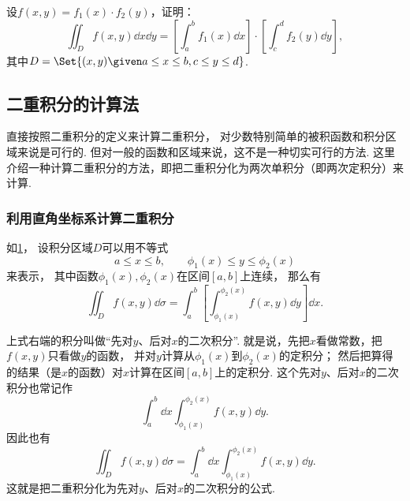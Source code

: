 \begin{example}
设\(f(x,y) = f_1(x) \cdot f_2(y)\)，证明：\[
	\iint_D f(x,y) \dd{x} \dd{y}
	= \left[ \int_a^b f_1(x) \dd{x} \right] \cdot \left[ \int_c^d f_2(y) \dd{y} \right],
\]
其中\(D = \Set{(x,y) \given a \leq x \leq b, c \leq y \leq d}\).
\end{example}

\subsection{二重积分的计算法}
直接按照二重积分的定义来计算二重积分，
对少数特别简单的被积函数和积分区域来说是可行的.
但对一般的函数和区域来说，这不是一种切实可行的方法.
这里介绍一种计算二重积分的方法，即把二重积分化为两次单积分（即两次定积分）来计算.

\subsubsection{利用直角坐标系计算二重积分}
如\cref{figure:二重积分.X型区域}，
设积分区域\(D\)可以用不等式
\[
	a \leq x \leq b, \qquad
	\phi_1(x) \leq y \leq \phi_2(x)
\]来表示，
其中函数\(\phi_1(x),\phi_2(x)\)在区间\([a,b]\)上连续，
那么有\[
	\iint_D f(x,y) \dd{\sigma}
	= \int_a^b \left[ \int_{\phi_1(x)}^{\phi_2(x)} f(x,y) \dd{y} \right] \dd{x}.
\]

上式右端的积分叫做“先对\(y\)、后对\(x\)的二次积分”.
就是说，先把\(x\)看做常数，把\(f(x,y)\)只看做\(y\)的函数，
并对\(y\)计算从\(\phi_1(x)\)到\(\phi_2(x)\)的定积分；
然后把算得的结果（是\(x\)的函数）对\(x\)计算在区间\([a,b]\)上的定积分.
这个先对\(y\)、后对\(x\)的二次积分也常记作\[
	\int_a^b \dd{x} \int_{\phi_1(x)}^{\phi_2(x)} f(x,y) \dd{y}.
\]
因此也有\[
	\iint_D f(x,y) \dd{\sigma}
	= \int_a^b \dd{x} \int_{\phi_1(x)}^{\phi_2(x)} f(x,y) \dd{y}.
\]
这就是把二重积分化为先对\(y\)、后对\(x\)的二次积分的公式.

\begin{figure}[htb]
	\centering
	\caption{}
	\label{figure:二重积分.X型区域}
\end{figure}

